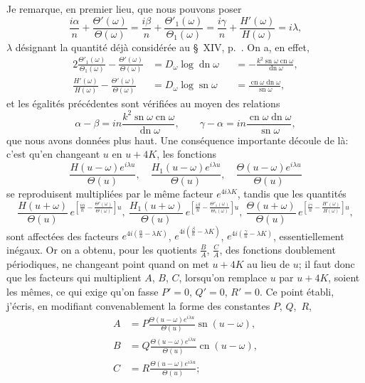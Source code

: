 \documentclass[11pt,leqno,oneside,letterpaper]{book}[2005/09/16]
\DeclareMathOperator{\sn}{sn}
\DeclareMathOperator{\cn}{cn}
\DeclareMathOperator{\dn}{dn}
\begin{document}
Je remarque, en premier lieu, que nous pouvons poser\label{page37}
\[
  \frac{i\alpha}{n} + \frac{\Theta'  (\omega)}{\Theta  (\omega)}
= \frac{i \beta}{n} + \frac{\Theta'_1(\omega)}{\Theta_1(\omega)}
= \frac{i\gamma}{n} + \frac{H'(\omega)}{H(\omega)}
= i\lambda,
\]
$\lambda$ d\'esignant la quantit\'e d\'ej\`a consid\'er\'ee au \S~XIV,
p.~\pageref{page31}. On a, en effet,
\begin{alignat*}{2}
  \frac{\Theta'_1(\omega)}{\Theta_1(\omega)}
- \frac{\Theta'  (\omega)}{\Theta  (\omega)}
&= D_{\omega} \log\dn\omega
&&= -\frac{k^2 \sn\omega \cn\omega}{\dn\omega},
\\
  \frac{H'(\omega)}{H(\omega)}
- \frac{\Theta'  (\omega)}{\Theta  (\omega)}
&= D_{\omega} \log\sn\omega
&&= \frac{ \cn\omega \dn\omega}{\sn\omega},
\end{alignat*}
et les \'egalit\'es pr\'ec\'edentes sont v\'erifi\'ees au moyen des relations
\[
  \alpha - \beta = in\frac{k^2 \sn\omega \cn\omega}{\dn\omega},
\qquad
  \gamma -\alpha = in\frac{    \cn\omega \dn\omega}{\sn\omega},
\]
que nous avons donn\'ees plus haut. Une cons\'equence importante d\'ecoule
de l\`a: c'est qu'en changeant $u$ en $u + 4K$, les fonctions
\[
\frac{H     (u-\omega) e^{i\lambda u}}{\Theta(u)},\quad
\frac{H_1   (u-\omega) e^{i\lambda u}}{\Theta(u)},\quad
\frac{\Theta(u-\omega) e^{i\lambda u}}{\Theta(u)}
\]
se reproduisent multipli\'ees par le m\^eme facteur
$e^{4i\lambda K}$, tandis que les quantit\'es
\[
\frac{H(u+\omega)}{\Theta(u)}\,
e^{\left[ \frac{i\alpha}{n}
        - \frac{\Theta'  (\omega)}{\Theta  (\omega)} \right]u},
\
\frac{H_1(u+\omega)}{\Theta(u)}\,
e^{\left[ \frac{i \beta}{n}
        - \frac{\Theta'_1(\omega)}{\Theta_1(\omega)} \right]u},
\
\frac{\Theta(u+\omega)}{\Theta(u)}\,
e^{\left[ \frac{i\gamma}{n}
        - \frac{H'(\omega)}{H(\omega)} \right]u},
\]
sont affect\'ees des facteurs
$e^{4i\left( \frac{\alpha}{n} - \lambda K \right)}$,
$e^{4i\left( \frac{\beta }{n} - \lambda K \right)}$,
$e^{4i\left( \frac{\gamma}{n} - \lambda K \right)}$,
essentiellement in\'egaux. Or on a obtenu, pour les quotients $\frac{B}{A}$, $\frac{C}{A}$, des fonctions
doublement p\'eriodiques, ne changeant point quand on met $u + 4K$ au
lieu de $u$; il faut donc que les facteurs qui multiplient $A$, $B$, $C$, lorsqu'on
remplace $u$ par $u + 4K$, soient les m\^emes, ce qui exige qu'on fasse $P'= 0$,
$Q'= 0$, $R' = 0$. Ce point \'etabli, j'\'ecris, en modifiant convenablement la
forme des constantes $P$, $Q$,~$R$,
\begin{align*}
A &= P\frac{\Theta(u-\omega) e^{i\lambda u}}{\Theta(u)} \sn(u-\omega),
\\
B &= Q\frac{\Theta(u-\omega) e^{i\lambda u}}{\Theta(u)} \cn(u-\omega),
\\
C &= R\frac{\Theta(u-\omega) e^{i\lambda u}}{\Theta(u)};
\end{align*}
\end{document}
